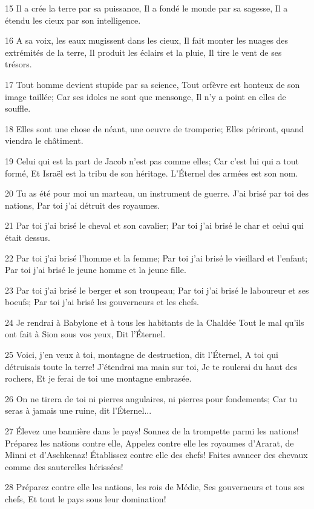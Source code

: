 \par 15 Il a crée la terre par sa puissance, Il a fondé le monde par sa sagesse, Il a étendu les cieux par son intelligence.
\par 16 A sa voix, les eaux mugissent dans les cieux, Il fait monter les nuages des extrémités de la terre, Il produit les éclairs et la pluie, Il tire le vent de ses trésors.
\par 17 Tout homme devient stupide par sa science, Tout orfèvre est honteux de son image taillée; Car ses idoles ne sont que mensonge, Il n'y a point en elles de souffle.
\par 18 Elles sont une chose de néant, une oeuvre de tromperie; Elles périront, quand viendra le châtiment.
\par 19 Celui qui est la part de Jacob n'est pas comme elles; Car c'est lui qui a tout formé, Et Israël est la tribu de son héritage. L'Éternel des armées est son nom.
\par 20 Tu as été pour moi un marteau, un instrument de guerre. J'ai brisé par toi des nations, Par toi j'ai détruit des royaumes.
\par 21 Par toi j'ai brisé le cheval et son cavalier; Par toi j'ai brisé le char et celui qui était dessus.
\par 22 Par toi j'ai brisé l'homme et la femme; Par toi j'ai brisé le vieillard et l'enfant; Par toi j'ai brisé le jeune homme et la jeune fille.
\par 23 Par toi j'ai brisé le berger et son troupeau; Par toi j'ai brisé le laboureur et ses boeufs; Par toi j'ai brisé les gouverneurs et les chefs.
\par 24 Je rendrai à Babylone et à tous les habitants de la Chaldée Tout le mal qu'ils ont fait à Sion sous vos yeux, Dit l'Éternel.
\par 25 Voici, j'en veux à toi, montagne de destruction, dit l'Éternel, A toi qui détruisais toute la terre! J'étendrai ma main sur toi, Je te roulerai du haut des rochers, Et je ferai de toi une montagne embrasée.
\par 26 On ne tirera de toi ni pierres angulaires, ni pierres pour fondements; Car tu seras à jamais une ruine, dit l'Éternel...
\par 27 Élevez une bannière dans le pays! Sonnez de la trompette parmi les nations! Préparez les nations contre elle, Appelez contre elle les royaumes d'Ararat, de Minni et d'Aschkenaz! Établissez contre elle des chefs! Faites avancer des chevaux comme des sauterelles hérissées!
\par 28 Préparez contre elle les nations, les rois de Médie, Ses gouverneurs et tous ses chefs, Et tout le pays sous leur domination!
